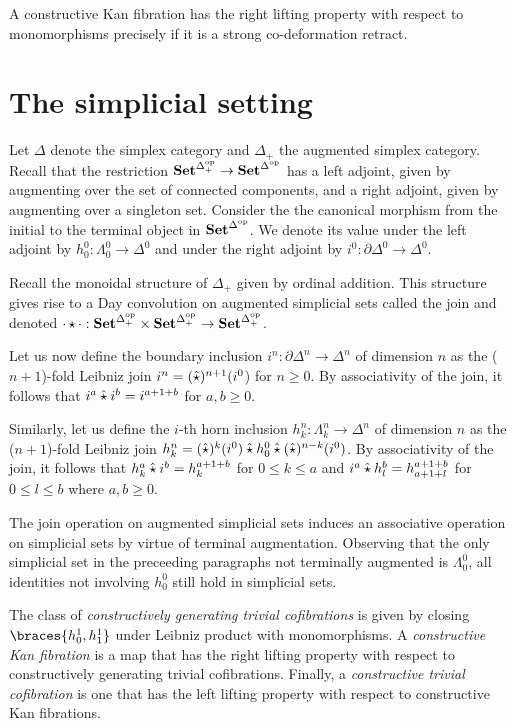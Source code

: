 \documentclass[reqno,10pt,a4paper,oneside]{amsart}
\begin{document}
\begin{corollary}
A constructive Kan fibration has the right lifting property with respect to monomorphisms precisely if it is a strong co-deformation retract.
\end{corollary}

\section{The simplicial setting}

Let $\Delta$ denote the simplex category and $\Delta_+$ the augmented simplex category.
Recall that the restriction $\mathbf{Set}^{\Delta_+^{\mathrm{op}}} \to \mathbf{Set}^{\Delta^{\mathrm{op}}}$ has a left adjoint, given by augmenting over the set of connected components, and a right adjoint, given by augmenting over a singleton set.
Consider the the canonical morphism from the initial to the terminal object in $\mathbf{Set}^{\Delta^{\mathrm{op}}}$.
We denote its value under the left adjoint by $h_0^0 : \Lambda_0^0 \to \Delta^0$ and under the right adjoint by $i^0 : \partial \Delta^0 \to \Delta^0$.

Recall the monoidal structure of $\Delta_+$ given by ordinal addition.
This structure gives rise to a Day convolution on augmented simplicial sets called the join and denoted $\mathop{\cdot} \star \mathop{\cdot} : \mathbf{Set}^{\Delta_+^{\mathrm{op}}} \times \mathbf{Set}^{\Delta_+^{\mathrm{op}}} \to \mathbf{Set}^{\Delta_+^{\mathrm{op}}}$.

Let us now define the boundary inclusion $i^n : \partial \Delta^n \to \Delta^n$ of dimension $n$ as the ($n+1$)-fold Leibniz join $i^n = (\mathbin{\hat{\star}})^{n+1}(i^0$) for $n \geq 0$.
By associativity of the join, it follows that $i^a \mathbin{\hat{\star}} i^b = i^{a+1+b}$ for $a, b \geq 0$.

Similarly, let us define the $i$-th horn inclusion $h_k^n : \Lambda_k^n \to \Delta^n$ of dimension $n$ as the ($n+1$)-fold Leibniz join $h_k^n = (\mathbin{\hat{\star}})^k(i^0) \mathbin{\hat{\star}} h_0^0 \mathbin{\hat{\star}} (\mathbin{\hat{\star}})^{n-k}(i^0)$.
By associativity of the join, it follows that $h_k^a \mathbin{\hat{\star}} i^b = h_k^{a+1+b}$ for $0 \leq k \leq a$ and $i^a \mathbin{\hat{\star}} h_l^b = h_{a+1+l}^{a+1+b}$ for $0 \leq l \leq b$ where $a, b \geq 0$.

The join operation on augmented simplicial sets induces an associative operation on simplicial sets by virtue of terminal augmentation.
Observing that the only simplicial set in the preceeding paragraphs not terminally augmented is $\Lambda_0^0$, all identities not involving $h_0^0$ still hold in simplicial sets.

\begin{definition}
\label{def:constructive-kan}
The class of \emph{constructively generating trivial cofibrations} is given by closing $\braces{h_0^1, h_1^1}$ under Leibniz product with monomorphisms.
A \emph{constructive Kan fibration} is a map that has the right lifting property with respect to constructively generating trivial cofibrations.
Finally, a \emph{constructive trivial cofibration} is one that has the left lifting property with respect to constructive Kan fibrations.
\end{definition}
\end{document}
